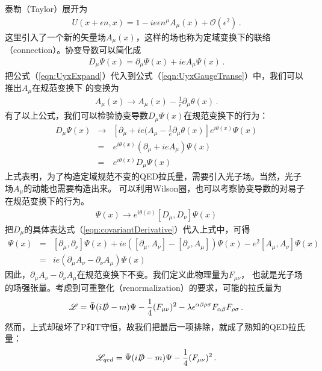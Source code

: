 泰勒（Taylor）展开为
\begin{eqnarray}
U(x+\epsilon n, x) = 1 - ie\epsilon n^{\mu} A_{\mu}(x) + \mathcal{O}(\epsilon^2) \, .
\label{eqn:UyxExpand}
\end{eqnarray}
这里引入了一个新的矢量场$A_{\mu}(x)$，这样的场也称为定域变换下的联络（connection）。协变导数可以简化成
\begin{eqnarray}
D_{\mu} \Psi(x) = \partial_{\mu}\Psi(x) + ieA_{\mu} \Psi(x) \, .
\label{eqn:covariantDerivative}
\end{eqnarray}
把公式（\ref{eqn:UyxExpand}）代入到公式（\ref{eqn:UyxGaugeTranse}）中，我们可以推出$A_{\mu}$在规范变换下
的变换为
\begin{eqnarray}
A_{\mu}(x) \to A_{\mu}(x) - \frac{1}{e}\partial_{\mu}\theta(x) \, .
\end{eqnarray}
有了以上公式，我们可以检验协变导数$D_{\mu}\Psi(x)$在规范变换下的行为：
\begin{eqnarray}
D_{\mu}\Psi(x) &\to& \left[\partial_{\mu} + ie(A_{\mu} - \frac{1}{e}\partial_{\mu}\theta(x) \right]
e^{i\theta(x)} \Psi(x)
\nonumber \\
&=& e^{i\theta(x)}(\partial_{\mu} + ieA_{\mu})\Psi(x) 
\nonumber \\
&=& e^{i\theta(x)} D_{\mu}\Psi(x)
\end{eqnarray}
上式表明，为了构造定域规范不变的QED拉氏量，需要引入光子场。当然，光子场$A_{\mu}$的动能也需要构造出来。
可以利用Wilson圈，也可以考察协变导数的对易子在规范变换下的行为。
\begin{eqnarray}
[D_{\mu}, D_{\nu}] \Psi(x) \to e^{i\theta(x)}[D_{\mu}, D_{\nu}] \Psi(x)
\end{eqnarray}
把$D_{\mu}$的具体表达式（\ref{eqn:covariantDerivative}）代入上式中，可得
\begin{eqnarray}
[D_{\mu}, D_{\nu}]\Psi(x) &=& [\partial_{\mu}, \partial_{\nu}]\Psi(x) + ie([\partial_{\mu}, A_{\nu}] 
- [\partial_{\nu},A_{\mu}])\Psi(x) - e^2 [A_{\mu}, A_{\nu}]\Psi(x)
\nonumber \\
&=& ie(\partial_{\mu}A_{\nu} - \partial_{\nu}A_{\mu})\Psi(x)
\end{eqnarray}
因此，$\partial_{\mu}A_{\nu} - \partial_{\nu}A_{\mu}$在规范变换下不变。我们定义此物理量为$F_{\mu\nu}$，
也就是光子场的场强张量。考虑到可重整化（renormalization）的要求，可能的拉氏量为
\begin{eqnarray}
\mathscr{L} = \bar{\Psi}(i\slashed{D} - m)\Psi - \frac{1}{4}(F_{\mu\nu})^2 - 
\lambda\epsilon^{\alpha\beta\rho\sigma}F_{\alpha\beta}F_{\rho\sigma} \, .
\end{eqnarray}
然而，上式却破坏了P和T守恒，故我们把最后一项排除，就成了熟知的QED拉氏量：
\begin{eqnarray}
\mathscr{L}_{qed} = \bar{\Psi}(i\slashed{D} - m)\Psi - \frac{1}{4}(F_{\mu\nu})^2 \, .
\label{eqn:qedlagrangian}
\end{eqnarray}

